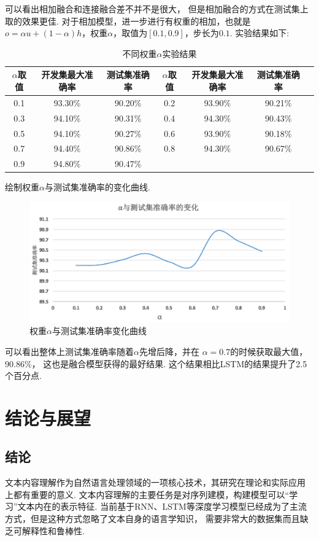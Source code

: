 \documentclass[bachelor,winfonts]{jnuthesis}
\begin{document}
可以看出相加融合和连接融合差不并不是很大，
但是相加融合的方式在测试集上取的效果更佳.
对于相加模型，进一步进行有权重的相加，也就是$o = \alpha u + (1-\alpha)h$，权重$\alpha$，取值为$[0.1,0.9]$，步长为$0.1$.
实验结果如下:
\begin{table}[h!]
  \centering
  \begin{tabular}{ccccccc}
    \toprule
    \textbf{$\alpha$取值} & \textbf{开发集最大准确率} & \textbf{测试集准确率} & \textbf{$\alpha$取值} & \textbf{开发集最大准确率} & \textbf{测试集准确率} \\
    \midrule
    0.1 & 93.30\% & 90.20\% & 0.2 & 93.90\% & 90.21\%\\
    0.3 & 94.10\% & 90.31\% & 0.4 & 94.30\% & 90.43\%\\
    0.5 & 94.10\% & 90.27\% & 0.6 & 93.90\% & 90.18\%\\
    0.7 & 94.40\% & 90.86\% & 0.8 & 94.30\% & 90.67\% \\
    0.9 & 94.80\% & 90.47\% &&&\\
    \bottomrule
  \end{tabular}
  \caption{不同权重$\alpha$实验结果}
\end{table}

绘制权重$\alpha$与测试集准确率的变化曲线.

\begin{figure}[h!]
  \centering
  \includegraphics[width=0.6\linewidth]{权重变化.png}
  \caption{权重$\alpha$与测试集准确率变化曲线}
\end{figure}

可以看出整体上测试集准确率随着$\alpha$先增后降，并在
$\alpha = 0.7$的时候获取最大值，90.86\%，
这也是融合模型获得的最好结果.
这个结果相比LSTM的结果提升了2.5个百分点.

\chapter{结论与展望}
\section{结论}
文本内容理解作为自然语言处理领域的一项核心技术，其研究在理论和实际应用
上都有重要的意义.
文本内容理解的主要任务是对序列建模，构建模型可以“学习”文本内在的表示特征.
当前基于RNN、LSTM等深度学习模型已经成为了主流方式，但是这种方式忽略了文本自身的语言学知识，
需要非常大的数据集而且缺乏可解释性和鲁棒性.
\end{document}
